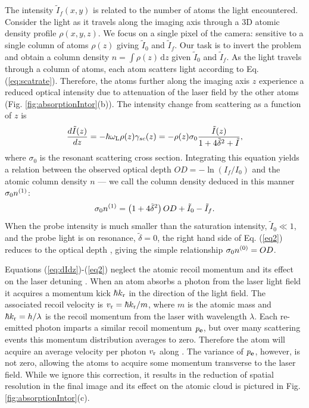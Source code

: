 The intensity $\tilde{I}_f(x,y)$ is related to the number of atoms the light encountered. Consider the light as it travels along the imaging axis \ez{} through a 3D atomic density profile $\rho(x,y,z)$. We focus on a single pixel of the camera: sensitive to a single column of atoms $\rho(z)$ giving  $\tilde{I}_0$ and $\tilde{I}_f$. Our task is to invert the problem and obtain a column density $n = \int \rho\left(z\right) \,\mathrm{d}z$ given $\tilde{I}_0$ and $\tilde{I}_f$. As the light travels through a column of atoms, each atom scatters light according to Eq. (\ref{eq:scatrate}). Therefore, the atoms further along the imaging axis $z$ experience a reduced optical intensity due to attenuation of the laser field by the other atoms (Fig. \ref{fig:absorptionIntor}(b)). The intensity change from scattering as a function of $z$ is
\begin{equation}
\frac{d\tilde{I}(z)}{dz}=-\hbar\omega_{\rm{L}}\rho(z)\gamma_{sc}(z)=-\rho(z)\sigma_0\frac{\tilde{I}(z)}{1+4\tilde{\delta}^2 +\tilde{I}},
\label{eq:dIdz}
\end{equation}
where $\sigma_0$ is the resonant scattering cross section. Integrating this equation yields a relation between the observed optical depth $OD=-\ln \left(I_f/I_0\right)$ and the atomic column density $n$ \cite{Reinaudi07} --- we call the column density deduced in this manner $\sigma_0 n^{\rm{(1)}}$:
\begin{equation}
\sigma_0 n^{\rm{(1)}} = \left(1+4\tilde{\delta}^2\right)OD+ \tilde{I}_0-\tilde{I}_f.
\label{eq2}
\end{equation}
When the probe intensity is much smaller than the saturation intensity, $\tilde{I}_0\ll1$, and the probe light is on resonance, $\tilde{\delta}=0$, the right hand side of Eq. (\ref{eq2}) reduces to the optical depth \cite{Reinaudi07}, giving the simple relationship $\sigma_0 n^{\rm{(0)}}=OD$. 
	\par Equations (\ref{eq:dIdz})-(\ref{eq2}) neglect the atomic recoil momentum and its effect on the laser detuning \cite{Konstantinidis12}. When an atom absorbs a photon from the laser light field it acquires a momentum kick $\hbar  k_{\rm{r}}$ in the direction of the light field. The associated recoil velocity is $v_{\rm{r}}=\hbar k_{\rm{r}}/m$, where $m$ is the atomic mass and $\hbar k_{\rm{r}}= h/\lambda$ is the recoil momentum from the laser with wavelength $\lambda$. Each re-emitted photon imparts a similar recoil momentum $\bf{\mathit{p}_e}$, but over many scattering events this momentum distribution averages to zero. Therefore the atom  will acquire an average velocity per photon $v_{\rm{r}}$ along \ez{}. The variance of $\bf{\mathit{p}_e}$, however, is not zero, allowing the atoms to acquire some momentum transverse to the laser field. While we ignore this correction, it results in the reduction of spatial resolution in the final image and its effect on the atomic cloud is pictured in Fig. \ref{fig:absorptionIntor}(c).


